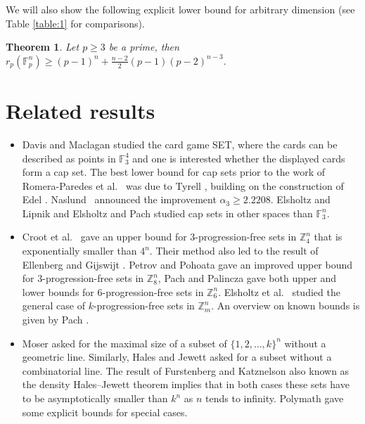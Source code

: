 \documentclass[12pt]{amsart}
\newcommand{\<}{\langle}
\renewcommand{\>}{\rangle}
\newtheorem{theorem}{Theorem}
\numberwithin{equation}{section}
\numberwithin{theorem}{section}
\begin{document}
We will also show the following explicit lower bound for arbitrary dimension (see Table \ref{table:1} for comparisons).

\begin{theorem}
\label{LBhighn}
Let $p\geq 3$ be a prime, then 
$r_p(\mathbb{F}_p^n)\geq(p-1)^n+\frac{n-2}{2}(p-1)(p-2)^{n-3}.$
\end{theorem}


\section{Related results}

\begin{itemize}
    \item Davis and Maclagan \cite{SET} studied the card game SET, where the cards can be described as points in $\mathbb{F}_3^4$ and one is interested whether the displayed cards form a cap set. The best lower bound for cap sets prior to the work of Romera-Paredes et al.~\cite{DeepMind} was due to Tyrell \cite{Tyrrell}, building on the construction of Edel \cite{Edel}. Naslund~\cite{naslund} announced the improvement $\alpha_3\geq 2.2208$. Elsholtz and Lipnik \cite{ElsholtzLipnik} and Elsholtz and Pach \cite{ElsholtzPach} studied cap sets in other spaces than $\mathbb{F}_3^n$.

    \item Croot et al.~\cite{CrootLevPach} gave an upper bound for $3$-progression-free sets in $\mathbb{Z}_4^n$ that is exponentially smaller than $4^n$. Their method also led to the result of Ellenberg and Gijswijt \cite{EG}. Petrov and Pohoata \cite{PetrovPohoata} gave an improved upper bound for $3$-progression-free sets in $\mathbb{Z}_8^n$, Pach and Palincza \cite{PachPalincza} gave both upper and lower bounds for $6$-progression-free sets in $\mathbb{Z}_6^n$. Elsholtz et al.~\cite{EKL} studied the general case of $k$-progression-free sets in $\mathbb{Z}_m^n$. An overview on known bounds is given by Pach \cite{Pach22}.

    \item Moser \cite{MoserProblem} asked for the maximal size of a subset of $\{1,2,\dots,k\}^n$ without a geometric line. Similarly, Hales and Jewett asked for a subset without a combinatorial line. The result of Furstenberg and Katznelson \cite{FK} also known as the density Hales–Jewett theorem implies that in both cases these sets have to be asymptotically smaller than $k^n$ as $n$ tends to infinity. Polymath \cite{PolymathMoser} gave some explicit bounds for special cases.


\end{itemize}
\end{document}
